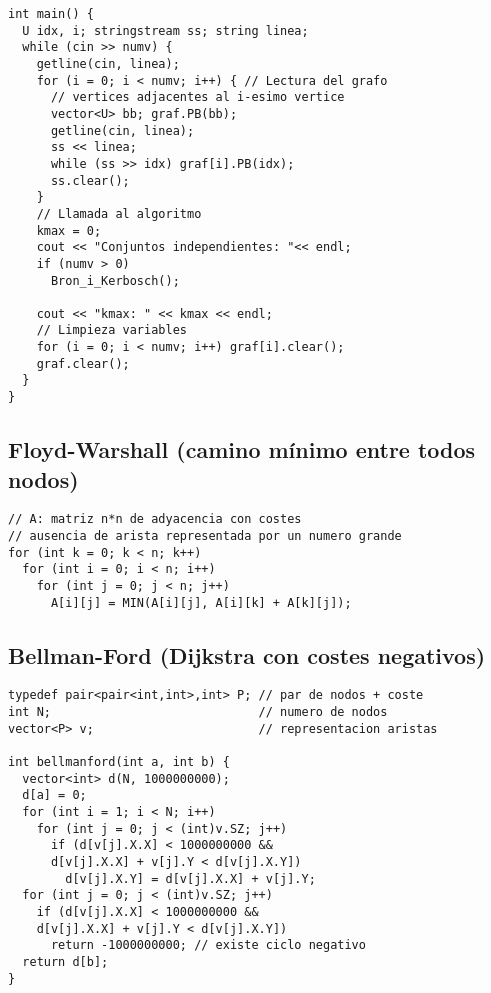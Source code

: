 \documentclass[10pt, a4, oneside]{article}
\begin{document}
\begin{verbatim}
int main() {
  U idx, i; stringstream ss; string linea;
  while (cin >> numv) {
    getline(cin, linea);
    for (i = 0; i < numv; i++) { // Lectura del grafo
      // vertices adjacentes al i-esimo vertice
      vector<U> bb; graf.PB(bb);
      getline(cin, linea);
      ss << linea;
      while (ss >> idx) graf[i].PB(idx);
      ss.clear();
    }
    // Llamada al algoritmo
    kmax = 0;
    cout << "Conjuntos independientes: "<< endl;
    if (numv > 0)
      Bron_i_Kerbosch();

    cout << "kmax: " << kmax << endl;
    // Limpieza variables
    for (i = 0; i < numv; i++) graf[i].clear();
    graf.clear();
  }
}
\end{verbatim}

\subsection{Floyd-Warshall (camino mínimo entre todos nodos)}
\begin{verbatim}
// A: matriz n*n de adyacencia con costes
// ausencia de arista representada por un numero grande
for (int k = 0; k < n; k++)
  for (int i = 0; i < n; i++)
    for (int j = 0; j < n; j++)
      A[i][j] = MIN(A[i][j], A[i][k] + A[k][j]);
\end{verbatim}

\subsection{Bellman-Ford (Dijkstra con costes negativos)}
\begin{verbatim}
typedef pair<pair<int,int>,int> P; // par de nodos + coste
int N;                             // numero de nodos
vector<P> v;                       // representacion aristas

int bellmanford(int a, int b) {
  vector<int> d(N, 1000000000);
  d[a] = 0;
  for (int i = 1; i < N; i++)
    for (int j = 0; j < (int)v.SZ; j++)
      if (d[v[j].X.X] < 1000000000 && 
      d[v[j].X.X] + v[j].Y < d[v[j].X.Y])
        d[v[j].X.Y] = d[v[j].X.X] + v[j].Y;
  for (int j = 0; j < (int)v.SZ; j++)
    if (d[v[j].X.X] < 1000000000 &&
    d[v[j].X.X] + v[j].Y < d[v[j].X.Y])
      return -1000000000; // existe ciclo negativo
  return d[b];
}
\end{verbatim}
\end{document}
